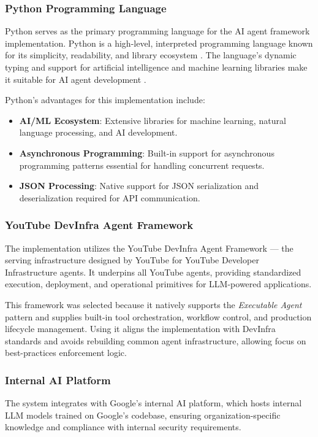 \begin{spacing}{1.2}
\subsubsection{Python Programming Language}
Python serves as the primary programming language for the AI agent framework implementation. Python is a high-level, interpreted programming language known for its simplicity, readability, and library ecosystem \cite{van1995python}. The language's dynamic typing and support for artificial intelligence and machine learning libraries make it suitable for AI agent development \cite{pedregosa2011scikit}.



Python's advantages for this implementation include:
\begin{itemize}
    \item \textbf{AI/ML Ecosystem}: Extensive libraries for machine learning, natural language processing, and AI development.
    \item \textbf{Asynchronous Programming}: Built-in support for asynchronous programming patterns essential for handling concurrent requests.
    \item \textbf{JSON Processing}: Native support for JSON serialization and deserialization required for API communication.
\end{itemize}



\subsubsection{YouTube DevInfra Agent Framework}
The implementation utilizes the YouTube DevInfra Agent Framework — the serving infrastructure designed by YouTube for YouTube Developer Infrastructure agents. It underpins all YouTube agents, providing standardized execution, deployment, and operational primitives for LLM-powered applications.

This framework was selected because it natively supports the \textit{Executable Agent} pattern and supplies built-in tool orchestration, workflow control, and production lifecycle management. Using it aligns the implementation with DevInfra standards and avoids rebuilding common agent infrastructure, allowing focus on best-practices enforcement logic.



\subsubsection{Internal AI Platform}
The system integrates with Google's internal AI platform, which hosts internal LLM models trained on Google's codebase, ensuring organization-specific knowledge and compliance with internal security requirements.



\end{spacing}
